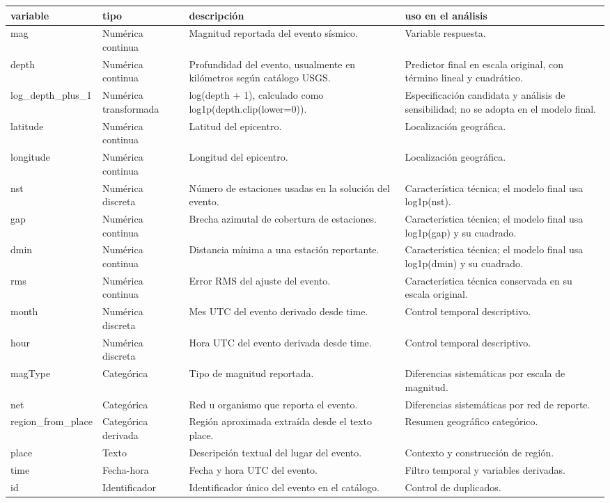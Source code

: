 \begin{tabular}{llll}
\toprule
variable & tipo & descripción & uso en el análisis \\
\midrule
mag & Numérica continua & Magnitud reportada del evento sísmico. & Variable respuesta. \\
depth & Numérica continua & Profundidad del evento, usualmente en kilómetros según catálogo USGS. & Predictor final en escala original, con término lineal y cuadrático. \\
log\_depth\_plus\_1 & Numérica transformada & log(depth + 1), calculado como log1p(depth.clip(lower=0)). & Especificación candidata y análisis de sensibilidad; no se adopta en el modelo final. \\
latitude & Numérica continua & Latitud del epicentro. & Localización geográfica. \\
longitude & Numérica continua & Longitud del epicentro. & Localización geográfica. \\
nst & Numérica discreta & Número de estaciones usadas en la solución del evento. & Característica técnica; el modelo final usa log1p(nst). \\
gap & Numérica continua & Brecha azimutal de cobertura de estaciones. & Característica técnica; el modelo final usa log1p(gap) y su cuadrado. \\
dmin & Numérica continua & Distancia mínima a una estación reportante. & Característica técnica; el modelo final usa log1p(dmin) y su cuadrado. \\
rms & Numérica continua & Error RMS del ajuste del evento. & Característica técnica conservada en su escala original. \\
month & Numérica discreta & Mes UTC del evento derivado desde time. & Control temporal descriptivo. \\
hour & Numérica discreta & Hora UTC del evento derivada desde time. & Control temporal descriptivo. \\
magType & Categórica & Tipo de magnitud reportada. & Diferencias sistemáticas por escala de magnitud. \\
net & Categórica & Red u organismo que reporta el evento. & Diferencias sistemáticas por red de reporte. \\
region\_from\_place & Categórica derivada & Región aproximada extraída desde el texto place. & Resumen geográfico categórico. \\
place & Texto & Descripción textual del lugar del evento. & Contexto y construcción de región. \\
time & Fecha-hora & Fecha y hora UTC del evento. & Filtro temporal y variables derivadas. \\
id & Identificador & Identificador único del evento en el catálogo. & Control de duplicados. \\
\bottomrule
\end{tabular}
